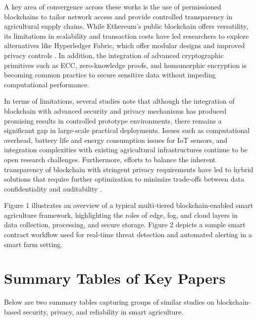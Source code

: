 \documentclass[12pt,onecolumn]{IEEEtran} %
\begin{document}
A key area of convergence across these works is the use of permissioned blockchains to tailor network access and provide controlled transparency in agricultural supply chains. While Ethereum's public blockchain offers versatility, its limitations in scalability and transaction costs have led researchers to explore alternatives like Hyperledger Fabric, which offer modular designs and improved privacy controls \cite{aliyu2023blockchainbasedsmartfarm, soy2025blockchainintegrationin}. In addition, the integration of advanced cryptographic primitives such as ECC, zero-knowledge proofs, and homomorphic encryption is becoming common practice to secure sensitive data without impeding computational performance.

In terms of limitations, several studies note that although the integration of blockchain with advanced security and privacy mechanisms has produced promising results in controlled prototype environments, there remains a significant gap in large-scale practical deployments. Issues such as computational overhead, battery life and energy consumption issues for IoT sensors, and integration complexities with existing agricultural infrastructures continue to be open research challenges. Furthermore, efforts to balance the inherent transparency of blockchain with stringent privacy requirements have led to hybrid solutions that require further optimization to minimize trade-offs between data confidentiality and auditability \cite{soy2025blockchainintegrationin}.

Figure 1 illustrates an overview of a typical multi-tiered blockchain-enabled smart agriculture framework, highlighting the roles of edge, fog, and cloud layers in data collection, processing, and secure storage. Figure 2 depicts a sample smart contract workflow used for real-time threat detection and automated alerting in a smart farm setting.

\section{Summary Tables of Key Papers}
Below are two summary tables capturing groups of similar studies on blockchain-based security, privacy, and reliability in smart agriculture.
\end{document}
